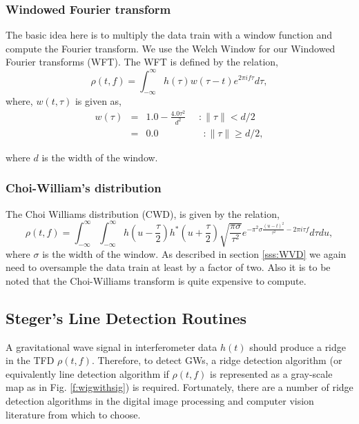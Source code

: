 \subsubsection{Windowed Fourier transform}

The basic idea here is to multiply the data train with a window
function and compute the Fourier transform. We use the Welch Window
for our Windowed Fourier transforms (WFT). The WFT is defined by the
relation,
$$
\rho(t,f) = \int_{-\infty}^\infty h(\tau) w(\tau - t) e^{2\pi i f\tau} d\tau, 
$$
where, $w(t,\tau)$ is given as,
\begin{eqnarray}
w(\tau) &=& 1.0 - \frac{4.0 \tau^2}{d^2}  \ \ \ \ \ \  : \|\tau\| < d/2\\
&=& 0.0 \ \ \ \ \ \ \ \ \ \ \ \ \ \ \ \ \ \ \ \ \ :  \|\tau\| \geq d/2,
\end{eqnarray}

where $d$ is the width of the window. 

\subsubsection{Choi-William's distribution}
The Choi Williams distribution (CWD),  is given by the relation,
\begin{equation}
\rho(t,f) = \int_{-\infty}^\infty \int_{-\infty}^\infty h\left(u - \frac{\tau}{2}\right)
h^*\left(u + \frac{\tau}{2}\right) \sqrt{\frac{\pi\sigma}{\tau^2}}
e^{-\pi^2\sigma\frac{(u-t)^2}{\tau^2} - 2\pi i \tau f} d\tau du, 
\end{equation}
where $\sigma$ is the width of the window. As described in section
\ref{sss:WVD} we again need to oversample the data train at least by a
factor of two. Also it is to be noted that the Choi-Williams transform
is quite expensive to compute. 

\subsection{Steger's Line Detection Routines}
A gravitational wave signal in interferometer data $h(t)$ should produce a
ridge in the TFD $\rho(t,f)$.  Therefore, to detect GWs, a ridge detection
algorithm (or equivalently line detection algorithm if $\rho(t,f)$ is
represented as a gray-scale map as in Fig.  \ref{f:wigwithsig}) is required.
Fortunately, there are a number of ridge detection algorithms in the digital
image processing and computer vision literature from which to choose.

